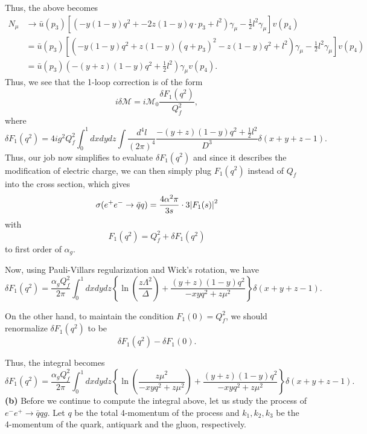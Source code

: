 \documentclass[11pt]{article}
\theoremstyle{definition}
\begin{document}
Thus, the above becomes
\begin{equation}
    \begin{aligned}
        N_\mu &\to \bar{u}(p_3)[(-y(1-y)q^2 + -2z(1-y)q\cdot p_3 + l^2 )\gamma_\mu - \frac{1}{2}l^2\gamma_\mu]v(p_4) \\
        &= \bar{u}(p_3)[(-y(1-y)q^2 + z(1-y)(q+p_3)^2 - z(1-y)q^2 + l^2 )\gamma_\mu - \frac{1}{2}l^2\gamma_\mu]v(p_4)\\
        &= \bar{u}(p_3)(-(y+z)(1-y)q^2  + \frac{1}{2}l^2 )\gamma_\mu v(p_4).
    \end{aligned}
\end{equation}
Thus, we see that the 1-loop correction is of the form 
\begin{equation}
    i\delta\mathcal{M} = i\mathcal{M}_0 \frac{\delta F_1(q^2)}{Q_f^2},
\end{equation}
where 
\begin{equation}
    \delta F_1(q^2) = 4ig^2Q_f^2\int^1_0dxdydz\int\frac{d^4l}{(2\pi)^4}\frac{-(y+z)(1-y)q^2  + \frac{1}{2}l^2}{D^3}\delta(x+y+z-1).
\end{equation}
Thus, our job now simplifies to evaluate $\delta F_1(q^2)$ and since it describes the modification of electric charge, we can then simply plug $F_1(q^2)$ instead of $Q_f$ into the cross section, which gives
\begin{equation}
    \sigma(e^+e^-\to\bar{q}q) = \frac{4\alpha^2\pi}{3s}\cdot 3\abs{F_1(s)}^2
\end{equation}
with 
\begin{equation}
    F_1(q^2) = Q_f^2 + \delta F_1(q^2)
\end{equation}
to first order of $\alpha_g$.

Now, using Pauli-Villars regularization and Wick's rotation, we have
\begin{equation}
    \delta F_1(q^2) = \frac{\alpha_gQ_f^2}{2\pi} \int^1_0 dxdydz \left\{\ln\left(\frac{z\Lambda^2}{\Delta}\right) + \frac{(y+z)(1-y)q^2}{- xyq^2 + z\mu^2}\right\}\delta(x+y+z-1).
\end{equation}

On the other hand, to maintain the condition $F_1(0)= Q_f^2$, we should renormalize $\delta F_1(q^2)$ to be
\begin{equation}
    \delta F_1(q^2) - \delta F_1(0).
\end{equation}

Thus, the integral becomes
\begin{equation}
    \delta F_1(q^2) = \frac{\alpha_gQ_f^2}{2\pi} \int^1_0 dxdydz \left\{\ln\left(\frac{z\mu^2}{- xyq^2 + z\mu^2}\right) + \frac{(y+z)(1-y)q^2}{- xyq^2 + z\mu^2}\right\}\delta(x+y+z-1).
\end{equation}
\newpage
\textbf{(b)} Before we continue to compute the integral above, let us study the process of $e^-e^+ \to \bar{q}qg$. Let $q$ be the total 4-momentum of the process and $k_1,k_2,k_3$ be the 4-momentum of the quark, antiquark and the gluon, respectively. 
\end{document}
